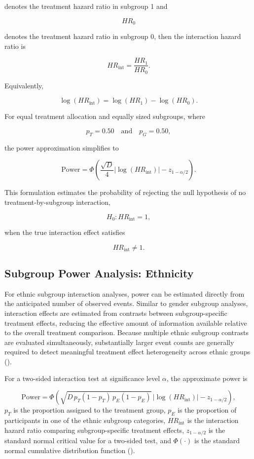 \documentclass[
  letterpaper,
  DIV=11,
  numbers=noendperiod]{scrartcl}
\begin{document}
denotes the treatment hazard ratio in subgroup 1 and

\[
HR_0
\]

denotes the treatment hazard ratio in subgroup 0, then the interaction
hazard ratio is

\[
HR_{\text{int}}
=
\frac{HR_1}{HR_0}.
\]

Equivalently,

\[
\log(HR_{\text{int}})
=
\log(HR_1)
-
\log(HR_0).
\]

For equal treatment allocation and equally sized subgroups, where

\[
p_T = 0.50
\quad \text{and} \quad
p_G = 0.50,
\]

the power approximation simplifies to

\[
\text{Power}
=
\Phi\left(
\frac{\sqrt{D}}{4}
|\log(HR_{\text{int}})|
-
z_{1-\alpha/2}
\right).
\]

This formulation estimates the probability of rejecting the null
hypothesis of no treatment-by-subgroup interaction,

\[
H_0: HR_{\text{int}} = 1,
\]

when the true interaction effect satisfies

\[
HR_{\text{int}} \neq 1.
\]

\subsection{Subgroup Power Analysis:
Ethnicity}\label{subgroup-power-analysis-ethnicity}

For ethnic subgroup interaction analyses, power can be estimated
directly from the anticipated number of observed events. Similar to
gender subgroup analyses, interaction effects are estimated from
contrasts between subgroup-specific treatment effects, reducing the
effective amount of information available relative to the overall
treatment comparison. Because multiple ethnic subgroup contrasts are
evaluated simultaneously, substantially larger event counts are
generally required to detect meaningful treatment effect heterogeneity
across ethnic groups ().

For a two-sided interaction test at significance level \(\alpha\), the
approximate power is

\[
\text{Power}
=
\Phi\left(
\sqrt{
D \,
p_T(1-p_T)\,
p_E(1-p_E)
}
\,
|\log(HR_{\text{int}})|
-
z_{1-\alpha/2}
\right),
\] \(p_T\) is the proportion assigned to the treatment group, \(p_E\) is
the proportion of participants in one of the ethnic subgroup categories,
\(HR_{\text{int}}\) is the interaction hazard ratio comparing
subgroup-specific treatment effects, \(z_{1-\alpha/2}\) is the standard
normal critical value for a two-sided test, and \(\Phi(\cdot)\) is the
standard normal cumulative distribution function
().
\end{document}
